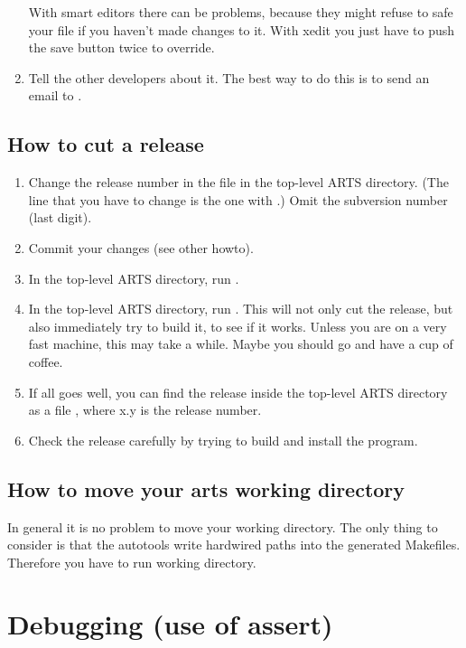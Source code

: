 \begin{enumerate}
  With smart editors there can be problems, because they might
  refuse to safe your file if you haven't made changes to it. With
  xedit you just have to push the save button twice to override.
\item Tell the other developers about it. The best way to do this is
  to send an email to .
\end{enumerate}


\subsection{How to cut a release}
\begin{enumerate}
\item Change the release number in the file  in the
  top-level ARTS directory. (The line that you have to change is the
  one with .) Omit the subversion number (last digit).
\item Commit your changes (see other howto). 
\item In the top-level ARTS directory, run .
\item In the top-level ARTS directory, run . This
  will not only cut the release, but also immediately try to build
  it, to see if it works. Unless you are on a very fast machine, this
  may take a while. Maybe you should go and have a cup of coffee.
\item If all goes well, you can find the release inside the top-level
  ARTS directory as a file , where x.y is the
  release number.
\item Check the release carefully by trying to build and install the
  program. 
\end{enumerate}


\subsection{How to move your arts working directory}

In general it is no problem to move your working directory.
The only thing to consider is that the autotools write hardwired paths into
the generated Makefiles. Therefore you have to run 
working directory.


\section{Debugging (use of assert)}
 
